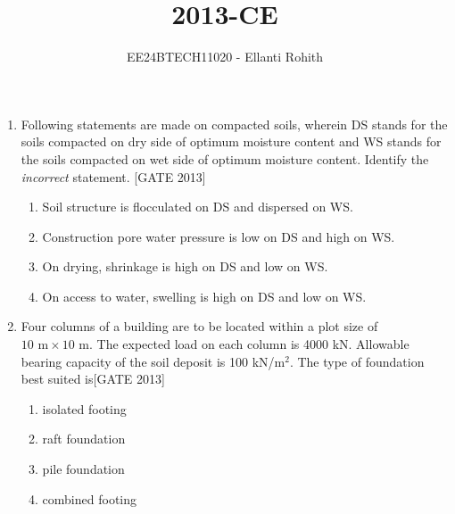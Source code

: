 \documentclass[journal,12pt,onecolumn]{IEEEtran}
\theoremstyle{remark}
\begin{document}

\vspace{3cm}

\title{2013-CE}
\author{EE24BTECH11020 -  Ellanti Rohith}
\maketitle

\renewcommand{\thefigure}{\theenumi}
\renewcommand{\thetable}{\theenumi}





\begin{enumerate}

    \item Following statements are made on compacted soils, wherein DS stands for the soils compacted on dry side of optimum moisture content and WS stands for the soils compacted on wet side of optimum moisture content. Identify the \textit{incorrect} statement. \hfill{[GATE 2013]}
    \begin{enumerate}
        \item Soil structure is flocculated on DS and dispersed on WS.
        \item Construction pore water pressure is low on DS and high on WS.
        \item On drying, shrinkage is high on DS and low on WS.
        \item On access to water, swelling is high on DS and low on WS.\\
    \end{enumerate}

    
      
    \item Four columns of a building are to be located within a plot size of $10  \text{ m} \times 10  \text{ m}$. The expected load on each column is 4000 kN. Allowable bearing capacity of the soil deposit is 100 kN/m$^2$. The type of foundation best suited is\hfill{[GATE 2013]}
    \begin{multicols}{2}
    \begin{enumerate}
        \item isolated footing
        \item raft foundation
        \item pile foundation
        \item combined footing
    \end{enumerate}
    \end{multicols}


\end{enumerate}
\end{document}
